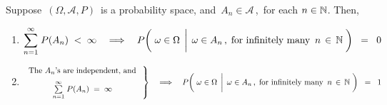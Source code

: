 \begin{theorem}\label{theorem:BorelCantelli}
\mbox{}\vskip 0.1cm
\noindent
Suppose \,$(\Omega,\mathcal{A},P)$\, is a probability space, and
\,$A_{n} \in \mathcal{A}$\,,\, for each $n \in \mathbb{N}$.
Then,
\begin{enumerate}
\item
	\begin{equation*}
	\overset{\infty}{\underset{n=1}{\sum}}\;P(A_{n}) \; < \; \infty
	\quad\Longrightarrow\quad
		P\!\left(\,
			\left.
			\omega \in \overset{{\color{white}-}}{\Omega}
			\,\;\right\vert\;
			\omega \in A_{n}\,,\;\textnormal{for infinitely many \,$n\,\in\,\N$}
			\;\right)
		\;\; = \;\; 0
	\end{equation*}
\item
	\begin{equation*}
	\left.\begin{array}{c}
		\underset{{\color{white}-}}{\textnormal{The $A_{n}$'s are independent, and}}
		\\
	\overset{\infty}{\underset{n=1}{\sum}}\;P(A_{n}) \; = \; \infty
	\end{array}\;\right\}
	\quad\Longrightarrow\quad
		P\!\left(\,
			\left.
			\omega \in \overset{{\color{white}-}}{\Omega}
			\,\;\right\vert\;
			\omega \in A_{n}\,,\;\textnormal{for infinitely many \,$n\,\in\,\N$}
			\;\right)
		\;\; = \;\; 1
	\end{equation*}
\end{enumerate}
\end{theorem}
\proof
